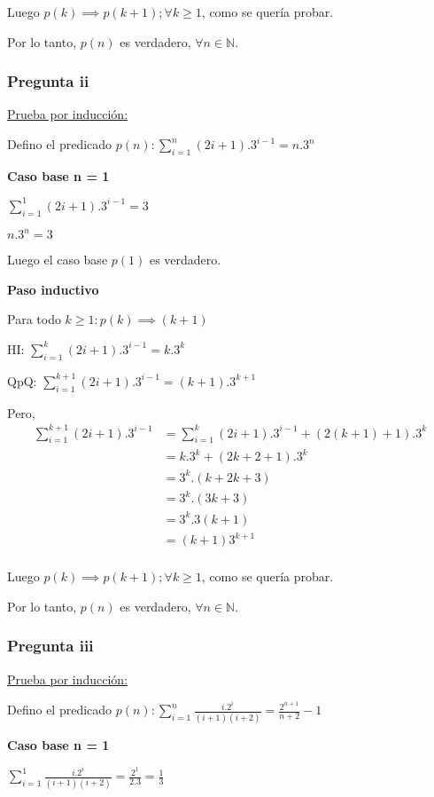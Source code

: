 Luego $p(k) \implies p(k+1); \forall k \geq 1$, como se quería probar.

Por lo tanto, $p(n)$ es verdadero, $\forall n \in \mathbb{N}$.

\subsubsection{Pregunta ii}

\underline{Prueba por inducción:}

Defino el predicado $p(n) : \sum_{i=1}^{n}(2i+1).3^{i-1}= n.3^n$

\textbf{Caso base n = 1}

$\sum_{i=1}^{1}(2i+1).3^{i-1} = 3$

$n.3^n = 3$

Luego el caso base $p(1)$ es verdadero.

\textbf{Paso inductivo}

Para todo $k \geq 1: p(k) \implies (k+1)$

HI: $\sum_{i=1}^{k}(2i+1).3^{i-1} = k.3^k$

QpQ: $\sum_{i=1}^{k+1}(2i+1).3^{i-1} = (k+1).3^{k+1}$

Pero,
\begin{align*}
    \sum_{i=1}^{k+1}(2i+1).3^{i-1} &= \sum_{i=1}^{k}(2i+1).3^{i-1} + \left( 2(k+1) + 1 \right).3^k \\
    &= k.3^k + (2k+2+1).3^k \\
    &= 3^k.(k+2k+3) \\
    &= 3^k.(3k+3) \\
    &= 3^k.3(k+1) \\
    &= (k+1)3^{k+1} \\
\end{align*}

Luego $p(k) \implies p(k+1); \forall k \geq 1$, como se quería probar.

Por lo tanto, $p(n)$ es verdadero, $\forall n \in \mathbb{N}$.

\subsubsection{Pregunta iii}

\underline{Prueba por inducción:}

Defino el predicado $p(n) : \sum_{i=1}^{n}\frac{i.2^i}{(i+1)(i+2)}= \frac{2^{n+1}}{n+2}-1$

\textbf{Caso base n = 1}

$ \sum_{i=1}^{1}\frac{i.2^i}{(i+1)(i+2)} = \frac{2^1}{2.3} = \frac{1}{3} $

